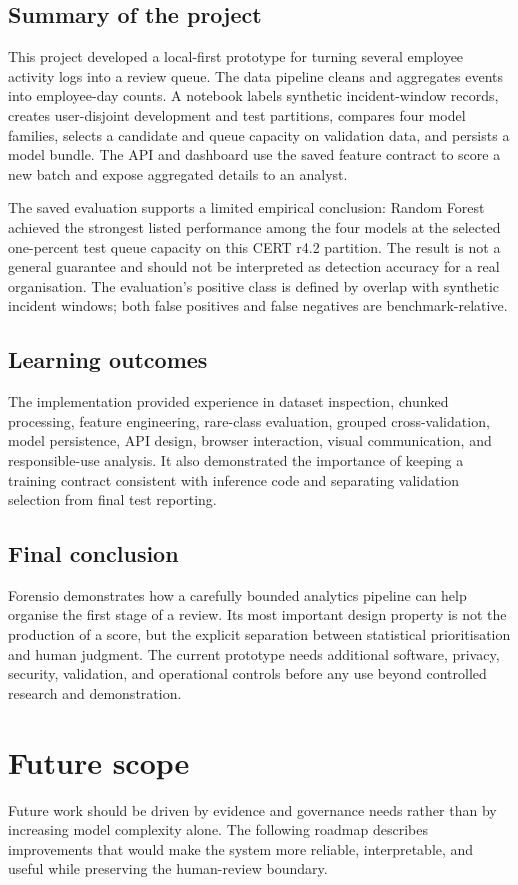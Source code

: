 \section{Summary of the project}
This project developed a local-first prototype for turning several
employee activity logs into a review queue. The data pipeline cleans
and aggregates events into employee-day counts. A notebook labels
synthetic incident-window records, creates user-disjoint development
and test partitions, compares four model families, selects a candidate
and queue capacity on validation data, and persists a model bundle.
The API and dashboard use the saved feature contract to score a new
batch and expose aggregated details to an analyst.

The saved evaluation supports a limited empirical conclusion:
Random Forest achieved the strongest listed performance among the
four models at the selected one-percent test queue capacity on this
CERT r4.2 partition. The result is not a general guarantee and should
not be interpreted as detection accuracy for a real organisation.
The evaluation's positive class is defined by overlap with synthetic
incident windows; both false positives and false negatives are
benchmark-relative.

\section{Learning outcomes}
The implementation provided experience in dataset inspection,
chunked processing, feature engineering, rare-class evaluation,
grouped cross-validation, model persistence, API design, browser
interaction, visual communication, and responsible-use analysis.
It also demonstrated the importance of keeping a training contract
consistent with inference code and separating validation selection
from final test reporting.

\section{Final conclusion}
Forensio demonstrates how a carefully bounded analytics pipeline can
help organise the first stage of a review. Its most important design
property is not the production of a score, but the explicit separation
between statistical prioritisation and human judgment. The current
prototype needs additional software, privacy, security, validation,
and operational controls before any use beyond controlled research
and demonstration.

\chapter{Future scope}
\label{chap:future}
Future work should be driven by evidence and governance needs rather
than by increasing model complexity alone. The following roadmap
describes improvements that would make the system more reliable,
interpretable, and useful while preserving the human-review boundary.

